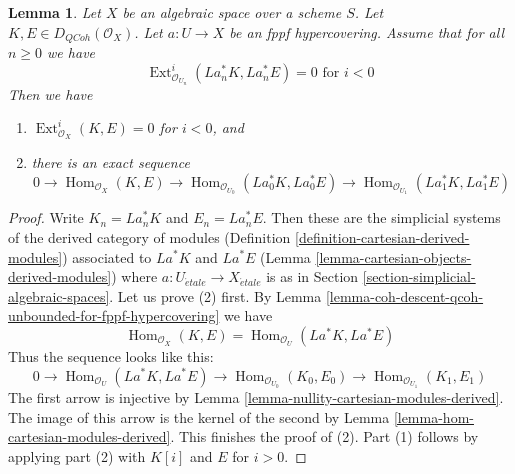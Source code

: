 \documentclass{stacks-project}
\theoremstyle{plain}
\newtheorem{lemma}[subsection]{Lemma}
\theoremstyle{definition}
\theoremstyle{remark}
\numberwithin{equation}{subsection}
\def\Hom{\mathop{\mathrm{Hom}}\nolimits}
\def\Ext{\mathop{\mathrm{Ext}}\nolimits}
\def\etale{{\acute{e}tale}}
\def\QCoh{\mathit{QCoh}}
\begin{document}
\begin{lemma}
\label{lemma-fppf-neg-ext-zero-hom}
Let $X$ be an algebraic space over a scheme $S$.
Let $K, E \in D_\QCoh(\mathcal{O}_X)$.
Let $a : U \to X$ be an fppf hypercovering.
Assume that for all $n \geq 0$ we have
$$
\Ext_{\mathcal{O}_{U_n}}^i(La_n^*K, La_n^*E) = 0
\text{ for } i < 0
$$
Then we have
\begin{enumerate}
\item $\Ext_{\mathcal{O}_X}^i(K, E) = 0$ for $i < 0$, and
\item there is an exact sequence
$$
0
\to
\Hom_{\mathcal{O}_X}(K, E)
\to
\Hom_{\mathcal{O}_{U_0}}(La_0^*K, La_0^*E)
\to
\Hom_{\mathcal{O}_{U_1}}(La_1^*K, La_1^*E)
$$
\end{enumerate}
\end{lemma}

\begin{proof}
Write $K_n = La_n^*K$ and $E_n = La_n^*E$. Then these are the
simplicial systems of the derived category of modules
(Definition \ref{definition-cartesian-derived-modules})
associated to $La^*K$ and $La^*E$
(Lemma \ref{lemma-cartesian-objects-derived-modules})
where $a : U_\etale \to X_\etale$ is as in
Section \ref{section-simplicial-algebraic-spaces}.
Let us prove (2) first. By
Lemma \ref{lemma-coh-descent-qcoh-unbounded-for-fppf-hypercovering}
we have
$$
\Hom_{\mathcal{O}_X}(K, E) =
\Hom_{\mathcal{O}_U}(La^*K, La^*E)
$$
Thus the sequence looks like this:
$$
0
\to
\Hom_{\mathcal{O}_U}(La^*K, La^*E)
\to
\Hom_{\mathcal{O}_{U_0}}(K_0, E_0)
\to
\Hom_{\mathcal{O}_{U_1}}(K_1, E_1)
$$
The first arrow  is injective by
Lemma \ref{lemma-nullity-cartesian-modules-derived}.
The image of this arrow is the kernel of the second
by Lemma \ref{lemma-hom-cartesian-modules-derived}.
This finishes the proof of (2).
Part (1) follows by applying part (2) with
$K[i]$ and $E$ for $i > 0$.
\end{proof}
\end{document}
